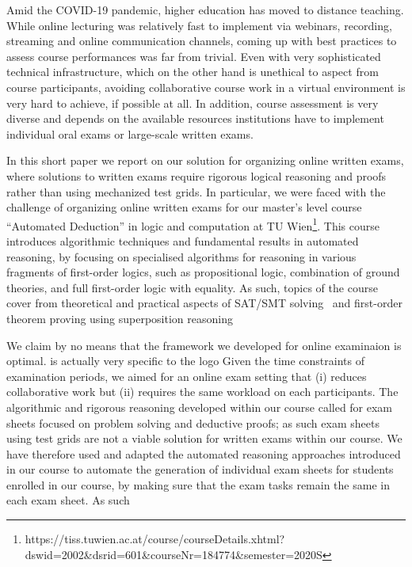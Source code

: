 Amid the COVID-19 pandemic, higher education has moved to distance
teaching. While online lecturing was relatively fast to implement via
webinars, recording,  streaming and online communication channels,
coming up with best practices to assess course performances was far
from trivial. Even with very sophisticated technical infrastructure,
which on the other hand is unethical to aspect from course
participants,  avoiding collaborative course work in a virtual
environment is very hard to achieve, if possible at all.
In addition, course assessment is very diverse and depends on the
available resources institutions have to implement individual oral
exams or large-scale written exams.

In this short paper we report on our solution for organizing online
written exams, where solutions to written exams require rigorous
logical reasoning and proofs rather than using mechanized test grids.
In particular, we were faced with the challenge of organizing online
written exams for our master's level course ``Automated
Deduction'' in logic and computation at TU
Wien\footnote{https://tiss.tuwien.ac.at/course/courseDetails.xhtml?dswid=2002\&dsrid=601\&courseNr=184774\&semester=2020S}.
This course introduces algorithmic techniques and fundamental results
in automated reasoning, by focusing on specialised algorithms for
reasoning in various fragments of first-order logics, such as
propositional logic, combination of ground theories, and full
first-order logic with equality.
As such, topics of the course cover from theoretical and practical
aspects of SAT/SMT solving~\cite{DPLLTinelli,NelsonOppen} and first-order theorem proving using
superposition reasoning~\cite{Ganzinger02,Rubio02,Vampire13}

We claim by no means that the framework we developed for online
examinaion is optimal.
is actually very specific to the logo
Given the time constraints of examination periods, we aimed for an
online exam setting that (i) reduces collaborative work but (ii)
requires the same workload on each participants.
The algorithmic and rigorous reasoning developed within our
course called for exam sheets focused on problem solving and deductive
proofs; as such exam sheets using test grids are not a viable solution
for written exams within our course.
We have therefore used and adapted the automated reasoning approaches introduced in our
course to automate the generation of individual exam sheets for
students enrolled in our course, by making sure that the exam tasks
remain the same in each exam sheet. As such

